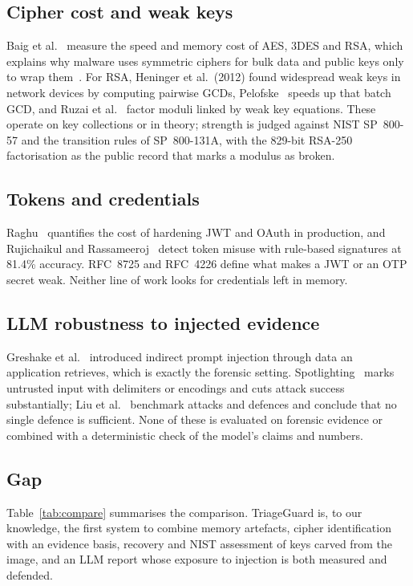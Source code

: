 \subsection{Cipher cost and weak keys}
Baig et al.~\cite{baig2024comparative} measure the speed and memory
cost of AES, 3DES and RSA, which explains why malware uses symmetric ciphers for bulk data and public
keys only to wrap them~\cite{oz2022survey}. For RSA, Heninger et al.\ (2012) found widespread
weak keys in network devices by computing pairwise GCDs, Pelofske~\cite{pelofske2024efficient} speeds up that
batch GCD, and Ruzai et al.~\cite{ruzai2024concurrent} factor moduli linked by weak key equations. These operate
on key collections or in theory; strength is judged against NIST SP~800-57 and the transition
rules of SP~800-131A, with the 829-bit RSA-250 factorisation as the public
record that marks a modulus as broken.

\subsection{Tokens and credentials}
Raghu~\cite{raghu2025context} quantifies the cost of hardening JWT and OAuth in production, and Rujichaikul and
Rassameeroj~\cite{rujichaikul2025token} detect token misuse with rule-based signatures at 81.4\% accuracy.
RFC~8725 and RFC~4226 define what makes a JWT or an OTP secret weak. Neither line of
work looks for credentials left in memory.

\subsection{LLM robustness to injected evidence}
Greshake et al.~\cite{greshake2023not} introduced indirect prompt injection through data an application
retrieves, which is exactly the forensic setting. Spotlighting~\cite{hines2024spotlighting} marks untrusted
input with delimiters or encodings and cuts attack success substantially;
Liu et al.~\cite{liu2024formalizing} benchmark attacks and defences and
conclude that no single defence is sufficient. None of these is evaluated on forensic evidence or combined
with a deterministic check of the model's claims and numbers.

\subsection{Gap}
Table~\ref{tab:compare} summarises the comparison. TriageGuard is, to our knowledge, the first system to
combine memory artefacts, cipher identification with an evidence basis, recovery and NIST assessment of keys
carved from the image, and an LLM report whose exposure to injection is both measured and defended.

